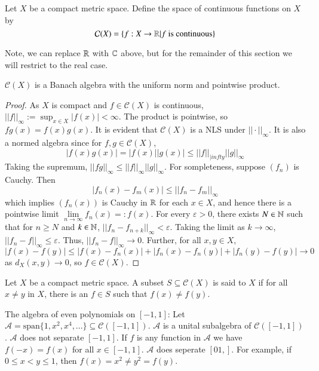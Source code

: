 \begin{defn}
    Let $X$ be a compact metric space. Define the space of continuous functions on $X$ by $$\mathcal{C}(X) = \{f:X\rightarrow \mathbb R\vert f\text{ is continuous}\}$$ 
\end{defn}
Note, we can replace $\mathbb R$ with $\mathbb C$ above, but for the remainder of this section we will restrict to the real case.

\begin{prop}
    $\mathcal{C}(X)$ is a Banach algebra with the uniform norm and pointwise product.
\end{prop}
\begin{proof}
    As $X$ is compact and $f \in \mathcal{C}(X)$ is continuous, $||f||_{\infty} := \sup_{x\in X}|f(x)| < \infty$. The product is pointwise, so $fg(x) = f(x)g(x)$. It is evident that $\mathcal{C}(X)$ is a NLS under $||\cdot||_{\infty}$. It is also a normed algebra since for $f,g \in \mathcal{C}(X)$, $$|f(x)g(x)| = |f(x)||g(x)| \leq ||f||_{|infty}||g||_{\infty}$$ Taking the supremum, $||fg||_{\infty} \leq ||f||_{\infty}||g||_{\infty}$. For sompleteness, suppose $(f_n)$ is Cauchy. Then $$|f_n(x) - f_m(x)| \leq ||f_n-f_m||_{\infty}$$ which implies $(f_n(x))$ is Cauchy in $\mathbb R$ for each $x \in X$, and hence there is a pointwise limit $\lim\limits_{n\rightarrow \infty}f_n(x) =: f(x)$. For every $\varepsilon > 0$, there exists $N \in \mathbb N$ such that for $n\geq N$ and $k \in \mathbb N$, $||f_n-f_{n+k}||_{\infty} < \varepsilon$. Taking the limit as $k\rightarrow \infty$, $||f_n-f||_{\infty} \leq \varepsilon$. Thus, $||f_n-f||_{\infty}\rightarrow 0$. Further, for all $x, y \in X$, $$|f(x) - f(y)| \leq |f(x) - f_n(x)| + |f_n(x) - f_n(y)| + |f_n(y) - f(y)|\rightarrow 0$$ as $d_X(x,y)\rightarrow 0$, so $f \in \mathcal{C}(X)$.
\end{proof}

\begin{defn}
    Let $X$ be a compact metric space. A subset $S \subseteq \mathcal{C}(X)$ is said to  $X$ if for all $x \neq y$ in $X$, there is an $f \in S$ such that $f(x) \neq f(y)$.
\end{defn}

\begin{eg}
    The algebra of even polynomials on $[-1,1]$: Let $\mathcal{A} = \text{span}\{1,x^2,x^4,...\} \subseteq \mathcal{C}([-1,1])$. $\mathcal{A}$ is a unital subalgebra of $\mathcal{C}([-1,1])$. $\mathcal{A}$ does not separate $[-1,1]$. If $f$ is any function in $\mathcal{A}$ we have $f(-x) = f(x)$ for all $x \in [-1,1]$. $\mathcal{A}$ does seperate $[01,]$. For example, if $0 \leq x < y \leq 1$, then $f(x) = x^2 \neq y^2 = f(y)$.
\end{eg}

